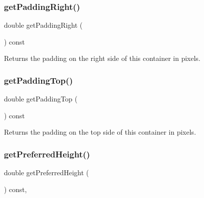 \mbox{\label{classGContainer_a8d75cea586f7cd6611432122a080ecce}} 
\subsubsection{\texorpdfstring{get\+Padding\+Right()}{getPaddingRight()}}
{\footnotesize\ttfamily double get\+Padding\+Right (\begin{DoxyParamCaption}{ }\end{DoxyParamCaption}) const\hspace{0.3cm}{\ttfamily [virtual]}}



Returns the padding on the right side of this container in pixels. 

\mbox{\label{classGContainer_ada97c35b2f3366886a49d63fff9d7bd4}} 
\subsubsection{\texorpdfstring{get\+Padding\+Top()}{getPaddingTop()}}
{\footnotesize\ttfamily double get\+Padding\+Top (\begin{DoxyParamCaption}{ }\end{DoxyParamCaption}) const\hspace{0.3cm}{\ttfamily [virtual]}}



Returns the padding on the top side of this container in pixels. 

\mbox{\label{classGInteractor_a747de0961653847bdc6615dbf756d715}} 
\subsubsection{\texorpdfstring{get\+Preferred\+Height()}{getPreferredHeight()}}
{\footnotesize\ttfamily double get\+Preferred\+Height (\begin{DoxyParamCaption}{ }\end{DoxyParamCaption}) const\hspace{0.3cm}{\ttfamily [virtual]}, {\ttfamily [inherited]}}



